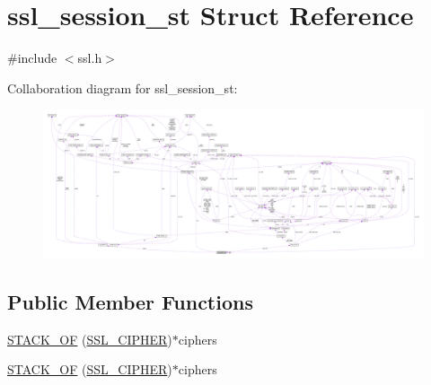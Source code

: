 \hypertarget{structssl__session__st}{}\section{ssl\+\_\+session\+\_\+st Struct Reference}
\label{structssl__session__st}


{\ttfamily \#include $<$ssl.\+h$>$}



Collaboration diagram for ssl\+\_\+session\+\_\+st\+:\nopagebreak
\begin{figure}[H]
\begin{center}
\leavevmode
\includegraphics[width=350pt]{structssl__session__st__coll__graph}
\end{center}
\end{figure}
\subsection*{Public Member Functions}
\begin{DoxyCompactItemize}
\item 
\hyperlink{structssl__session__st_a83e80140dccf7061b57dbc9fc5138d5b}{S\+T\+A\+C\+K\+\_\+\+OF} (\hyperlink{include_2openssl_2ssl_8h_a548d7a5d565a9e0e9bd45c49f8c95701}{S\+S\+L\+\_\+\+C\+I\+P\+H\+ER})$\ast$ciphers
\item 
\hyperlink{structssl__session__st_a83e80140dccf7061b57dbc9fc5138d5b}{S\+T\+A\+C\+K\+\_\+\+OF} (\hyperlink{include_2openssl_2ssl_8h_a548d7a5d565a9e0e9bd45c49f8c95701}{S\+S\+L\+\_\+\+C\+I\+P\+H\+ER})$\ast$ciphers
\end{DoxyCompactItemize}
